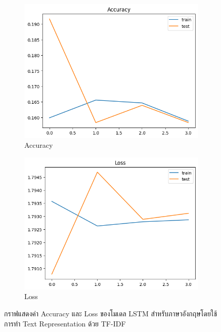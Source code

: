 \documentclass[12pt,oneside,openright,a4paper]{cpe-thai-project}
\begin{document}
      \begin{figure}[!ht]\centering
        \begin{subfigure}{0.49\textwidth}
          \includegraphics[width=\linewidth]{./img/lstm_tfidf_eng_acc.png} 
          \caption{Accuracy}
          \label{fig:lstm_tfidf_eng_acc}
        \end{subfigure}
        \begin{subfigure}{0.49\textwidth}
          \includegraphics[width=\linewidth]{./img/lstm_tfidf_eng_loss.png}
          \caption{Loss}
          \label{fig:lstm_tfidf_eng_loss}
        \end{subfigure}
        \caption{กราฟแสดงค่า Accuracy และ Loss ของโมเดล LSTM สำหรับภาษาอังกฤษโดยใช้การทำ Text Representation ด้วย TF-IDF}
        \label{fig:lstm_tfidf_eng}
      \end{figure}
\end{document}
